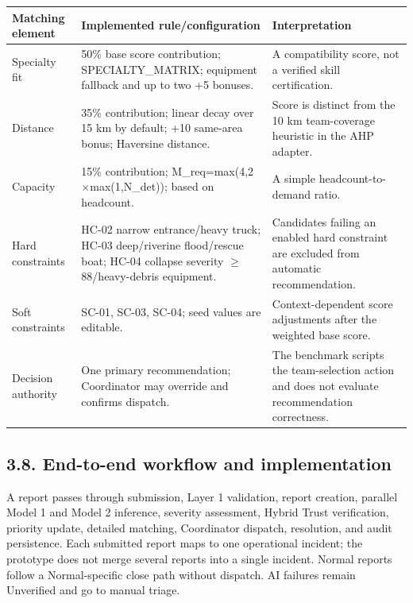 \documentclass[pdflatex,sn-mathphys-ay]{sn-jnl}
\begin{document}
\begin{center}
\small
\renewcommand{\arraystretch}{1.15}
\setlength{\tabcolsep}{3pt}
\begin{tabularx}{\textwidth}{|X|X|X|}\hline
Matching element & Implemented rule/configuration & Interpretation \\ \hline
Specialty fit & 50\% base score contribution; SPECIALTY\_MATRIX; equipment fallback and up to two +5 bonuses. & A compatibility score, not a verified skill certification. \\ \hline
Distance & 35\% contribution; linear decay over 15 km by default; +10 same-area bonus; Haversine distance. & Score is distinct from the 10 km team-coverage heuristic in the AHP adapter. \\ \hline
Capacity & 15\% contribution; M\_req=max(4,2$\times$max(1,N\_det)); based on headcount. & A simple headcount-to-demand ratio. \\ \hline
Hard constraints & HC-02 narrow entrance/heavy truck; HC-03 deep/riverine flood/rescue boat; HC-04 collapse severity $\geq$88/heavy-debris equipment. & Candidates failing an enabled hard constraint are excluded from automatic recommendation. \\ \hline
Soft constraints & SC-01, SC-03, SC-04; seed values are editable. & Context-dependent score adjustments after the weighted base score. \\ \hline
Decision authority & One primary recommendation; Coordinator may override and confirms dispatch. & The benchmark scripts the team-selection action and does not evaluate recommendation correctness. \\ \hline
\end{tabularx}
\end{center}

\subsection*{3.8. End-to-end workflow and implementation}

A report passes through submission, Layer 1 validation, report creation, parallel Model 1 and Model 2 inference, severity assessment, Hybrid Trust verification, priority update, detailed matching, Coordinator dispatch, resolution, and audit persistence. Each submitted report maps to one operational incident; the prototype does not merge several reports into a single incident. Normal reports follow a Normal-specific close path without dispatch. AI failures remain Unverified and go to manual triage.
\vspace{8pt}
\end{document}
